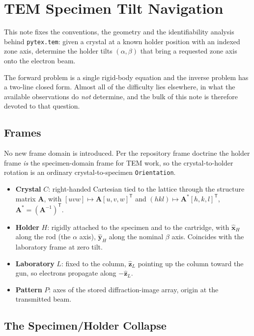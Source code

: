 \section{TEM Specimen Tilt Navigation}

This note fixes the conventions, the geometry and the identifiability analysis behind
\texttt{pytex.tem}: given a crystal at a known holder position with an indexed zone axis, determine
the holder tilts $(\alpha, \beta)$ that bring a requested zone axis onto the electron beam.

The forward problem is a single rigid-body equation and the inverse problem has a two-line closed
form. Almost all of the difficulty lies elsewhere, in what the available observations do
\emph{not} determine, and the bulk of this note is therefore devoted to that question.

\subsection{Frames}

No new frame domain is introduced. Per the repository frame doctrine the holder frame \emph{is}
the specimen-domain frame for TEM work, so the crystal-to-holder rotation is an ordinary
crystal-to-specimen \texttt{Orientation}.

\begin{itemize}
  \item \textbf{Crystal} $C$: right-handed Cartesian tied to the lattice through the structure
    matrix $\mathbf{A}$, with $[uvw] \mapsto \mathbf{A}[u,v,w]^{\mathsf T}$ and
    $(hkl) \mapsto \mathbf{A}^{*}[h,k,l]^{\mathsf T}$, $\mathbf{A}^{*} = (\mathbf{A}^{-1})^{\mathsf T}$.
  \item \textbf{Holder} $H$: rigidly attached to the specimen and to the cartridge, with
    $\hat{\mathbf{x}}_H$ along the rod (the $\alpha$ axis), $\hat{\mathbf{y}}_H$ along the nominal
    $\beta$ axis. Coincides with the laboratory frame at zero tilt.
  \item \textbf{Laboratory} $L$: fixed to the column, $\hat{\mathbf{z}}_L$ pointing up the column
    toward the gun, so electrons propagate along $-\hat{\mathbf{z}}_L$.
  \item \textbf{Pattern} $P$: axes of the stored diffraction-image array, origin at the
    transmitted beam.
\end{itemize}

\subsection{The Specimen/Holder Collapse}

